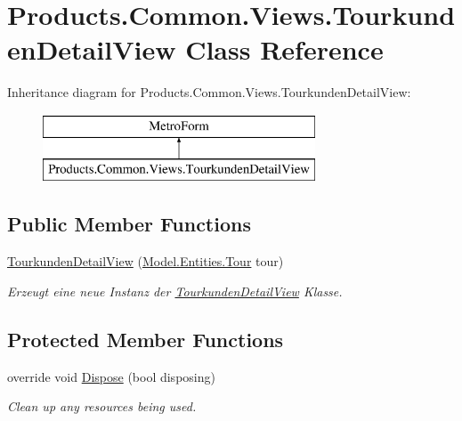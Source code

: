\hypertarget{class_products_1_1_common_1_1_views_1_1_tourkunden_detail_view}{}\section{Products.\+Common.\+Views.\+Tourkunden\+Detail\+View Class Reference}
\label{class_products_1_1_common_1_1_views_1_1_tourkunden_detail_view}
Inheritance diagram for Products.\+Common.\+Views.\+Tourkunden\+Detail\+View\+:\begin{figure}[H]
\begin{center}
\leavevmode
\includegraphics[height=2.000000cm]{class_products_1_1_common_1_1_views_1_1_tourkunden_detail_view}
\end{center}
\end{figure}
\subsection*{Public Member Functions}
\begin{DoxyCompactItemize}
\item 
\hyperlink{class_products_1_1_common_1_1_views_1_1_tourkunden_detail_view_ae7f95a4010d0bfc96723b2930069811e}{Tourkunden\+Detail\+View} (\hyperlink{class_products_1_1_model_1_1_entities_1_1_tour}{Model.\+Entities.\+Tour} tour)
\begin{DoxyCompactList}\small\item\em Erzeugt eine neue Instanz der \hyperlink{class_products_1_1_common_1_1_views_1_1_tourkunden_detail_view}{Tourkunden\+Detail\+View} Klasse. \end{DoxyCompactList}\end{DoxyCompactItemize}
\subsection*{Protected Member Functions}
\begin{DoxyCompactItemize}
\item 
override void \hyperlink{class_products_1_1_common_1_1_views_1_1_tourkunden_detail_view_a9332b990b17aff08da210bd61743e4ac}{Dispose} (bool disposing)
\begin{DoxyCompactList}\small\item\em Clean up any resources being used. \end{DoxyCompactList}\end{DoxyCompactItemize}


